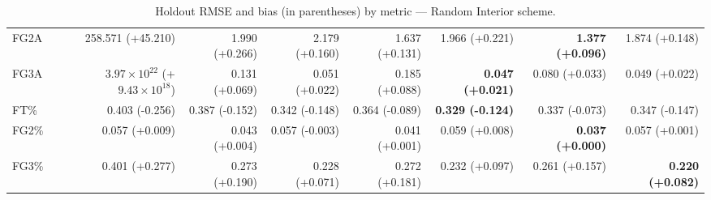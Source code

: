 \documentclass{article}
\begin{document}
\begin{table}[H]
{\begin{tabular}{lrrrrrrr}
FG2A & 258.571 (+45.210) & 1.990 (+0.266) & 2.179 (+0.160) & 1.637 (+0.131) & 1.966 (+0.221) & \textbf{1.377 (+0.096)} & 1.874 (+0.148) \\
FG3A & $3.97\times10^{22}$ (+$9.43\times10^{18}$) & 0.131 (+0.069) & 0.051 (+0.022) & 0.185 (+0.088) & \textbf{0.047 (+0.021)} & 0.080 (+0.033) & 0.049 (+0.022) \\
FT\% & 0.403 (-0.256) & 0.387 (-0.152) & 0.342 (-0.148) & 0.364 (-0.089) & \textbf{0.329 (-0.124)} & 0.337 (-0.073) & 0.347 (-0.147) \\
FG2\% & 0.057 (+0.009) & 0.043 (+0.004) & 0.057 (-0.003) & 0.041 (+0.001) & 0.059 (+0.008) & \textbf{0.037 (+0.000)} & 0.057 (+0.001) \\
FG3\% & 0.401 (+0.277) & 0.273 (+0.190) & 0.228 (+0.071) & 0.272 (+0.181) & 0.232 (+0.097) & 0.261 (+0.157) & \textbf{0.220 (+0.082)} \\
\bottomrule
\end{tabular}
}
\caption{Holdout RMSE and bias (in parentheses) by metric — Random Interior scheme.}
\label{tab:coverage_random_interior}
\end{table}
\end{document}
